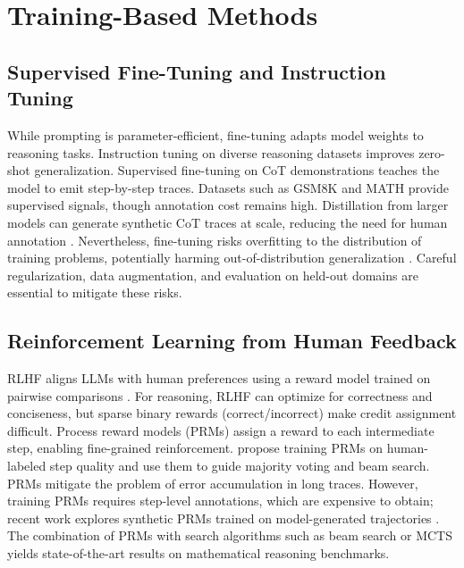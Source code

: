\documentclass[11pt,a4paper]{article}
\begin{document}
\section{Training-Based Methods}
\label{sec:training}
\subsection{Supervised Fine-Tuning and Instruction Tuning}
While prompting is parameter-efficient, fine-tuning adapts model weights to reasoning tasks. Instruction tuning on diverse reasoning datasets \citep{chung2022scaling} improves zero-shot generalization. Supervised fine-tuning on CoT demonstrations \citep{nyre2021scratchpad} teaches the model to emit step-by-step traces. Datasets such as GSM8K \citep{cobbe2021gsm8k} and MATH \citep{hendrycks2021measuring} provide supervised signals, though annotation cost remains high. Distillation from larger models can generate synthetic CoT traces at scale, reducing the need for human annotation \citep{touvron2023llama}. Nevertheless, fine-tuning risks overfitting to the distribution of training problems, potentially harming out-of-distribution generalization \citep{min2022rethinking}. Careful regularization, data augmentation, and evaluation on held-out domains are essential to mitigate these risks.

\subsection{Reinforcement Learning from Human Feedback}
RLHF aligns LLMs with human preferences using a reward model trained on pairwise comparisons \citep{openai2023gpt4}. For reasoning, RLHF can optimize for correctness and conciseness, but sparse binary rewards (correct/incorrect) make credit assignment difficult. Process reward models (PRMs) \citep{uesato2022solving} assign a reward to each intermediate step, enabling fine-grained reinforcement. \citet{lightman2023let} propose training PRMs on human-labeled step quality and use them to guide majority voting and beam search. PRMs mitigate the problem of error accumulation in long traces. However, training PRMs requires step-level annotations, which are expensive to obtain; recent work explores synthetic PRMs trained on model-generated trajectories \citep{wang2022self}. The combination of PRMs with search algorithms such as beam search or MCTS yields state-of-the-art results on mathematical reasoning benchmarks.
\end{document}
